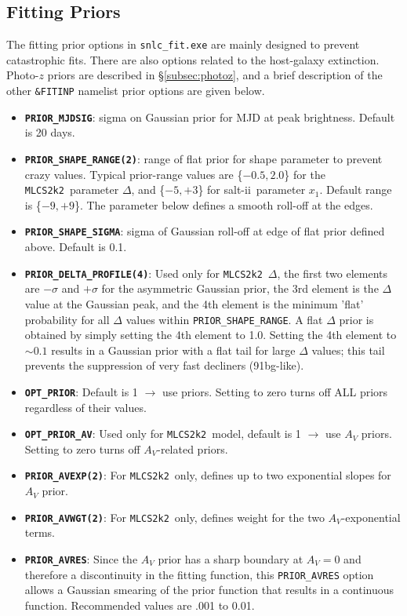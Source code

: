 \documentclass[12pt]{article}
\newcommand{\mlcs}{{\tt MLCS2k2}}
\newcommand{\SALTII}{{\sc salt-ii}}
\begin{document}
   \subsection{Fitting Priors}
   \label{subsec:priors}

The fitting prior options in {\tt snlc\_fit.exe} are mainly 
designed to prevent catastrophic fits. There are also
options related to the host-galaxy extinction.
Photo-$z$ priors are described in \S\ref{subsec:photoz},
and a brief description of the other {\tt \&FITINP}
namelist prior options are given below.
%
\begin{itemize}
  \item {\tt\bf PRIOR\_MJDSIG}: 
    sigma on Gaussian prior for MJD at peak brightness.
    Default is 20 days.
%
  \item {\tt\bf PRIOR\_SHAPE\_RANGE(2)}: 
    range of flat prior for shape parameter to prevent
    crazy values.
    Typical prior-range values are \{$-0.5,2.0$\} for the \mlcs\ 
    parameter $\Delta$, and \{$-5,+3$\} for \SALTII\ parameter $x_1$. 
    Default range is \{$-9,+9$\}.
    The parameter below defines a smooth roll-off at the edges.
%
  \item {\tt\bf PRIOR\_SHAPE\_SIGMA}: 
    sigma of Gaussian roll-off at edge of flat prior defined above.
    Default is 0.1.
%
  \item {\tt\bf PRIOR\_DELTA\_PROFILE(4)}:
    Used only for \mlcs\ $\Delta$,  
    the first two elements are $-\sigma$ and $+\sigma$
    for the asymmetric Gaussian prior, the 3rd element is
    the $\Delta$ value at the Gaussian peak,
    and the 4th element is the minimum 'flat'  probability
    for all $\Delta$ values within {\tt PRIOR\_SHAPE\_RANGE}.
    A flat $\Delta$ prior is obtained by simply setting the 
    4th element to 1.0. Setting the 4th element to $\sim 0.1$
    results in a Gaussian prior with a flat tail for large 
    $\Delta$ values; this tail prevents the suppression of
    very fast decliners (91bg-like).
%
  \item {\tt\bf OPT\_PRIOR}: Default is 1 $\to$ use priors.
    Setting to zero turns off ALL priors regardless of their values.
%
  \item {\tt\bf OPT\_PRIOR\_AV}: 
    Used only for \mlcs\ model, default is 1 $\to$ use $A_V$ priors.
    Setting to zero turns off $A_V$-related priors.
%
 \item {\tt\bf PRIOR\_AVEXP(2)}:
   For \mlcs\ only, defines up to two exponential slopes for $A_V$ prior.
%
 \item {\tt\bf PRIOR\_AVWGT(2)}:
   For \mlcs\ only, defines weight for the two $A_V$-exponential terms.
%
 \item {\tt\bf PRIOR\_AVRES}:
   Since the $A_V$ prior has a sharp boundary at $A_V=0$ and therefore
   a discontinuity in the fitting function, this {\tt PRIOR\_AVRES}
   option allows a Gaussian smearing of the prior function that results
   in a continuous function. Recommended values are .001 to 0.01.
\end{itemize}
\end{document}
